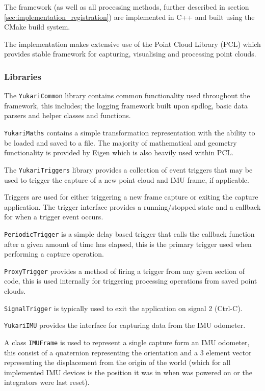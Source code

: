 \documentclass{entcs}
\begin{document}
The framework (as well as all processing methods, further described in section
\ref{sec:implementation_registration}) are implemented in C++ and built using
the CMake \cite{CMake} build system.

The implementation makes extensive use of the Point Cloud Library (PCL) which
provides stable framework for capturing, visualising and processing point
clouds.

\subsubsection{Libraries}

The \texttt{YukariCommon} library contains common functionality used throughout
the framework, this includes; the logging framework built upon spdlog, basic
data parsers and helper classes and functions.

\texttt{YukariMaths} contains a simple transformation representation with the
ability to be loaded and saved to a file. The majority of mathematical and
geometry functionality is provided by Eigen \cite{eigenweb} which is also
heavily used within PCL.

The \texttt{YukariTriggers} library provides a collection of event triggers that
may be used to trigger the capture of a new point cloud and IMU frame, if
applicable.

Triggers are used for either triggering a new frame capture or exiting the
capture application. The trigger interface provides a running/stopped state and
a callback for when a trigger event occurs.

\texttt{PeriodicTrigger} is a simple delay based trigger that calls the callback
function after a given amount of time has elapsed, this is the primary trigger
used when performing a capture operation.

\texttt{ProxyTrigger} provides a method of firing a trigger from any given
section of code, this is used internally for triggering processing operations
from saved point clouds.

\texttt{SignalTrigger} is typically used to exit the application on signal 2
(Ctrl-C).

\texttt{YukariIMU} provides the interface for capturing data from the IMU
odometer.

A class \texttt{IMUFrame} is used to represent a single capture form an IMU
odometer, this consist of a quaternion representing the orientation and a 3
element vector representing the displacement from the origin of the world (which
for all implemented IMU devices is the position it was in when was powered on or
the integrators were last reset).
\end{document}

